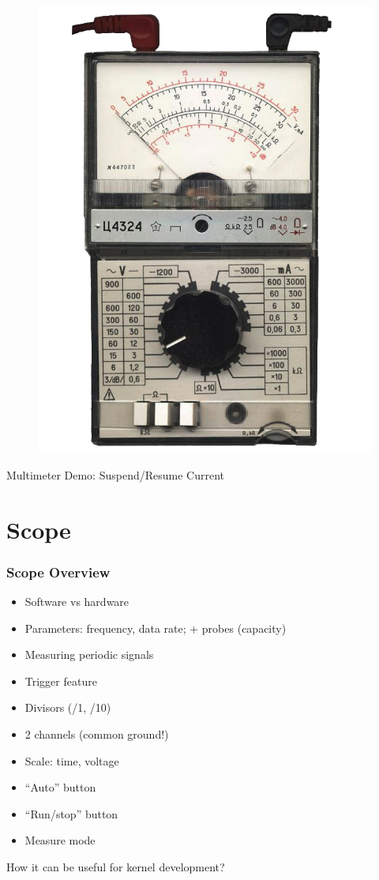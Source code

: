 \documentclass[aspectratio=169,usenames,dvipsnames]{beamer}
\begin{document}
\begin{frame}[standout]
  \begin{figure}
    \centering
    \includegraphics[scale=0.8]{images/multimeter.png}
  \end{figure}
  Multimeter Demo: Suspend/Resume Current
\end{frame}

\section{Scope}

\begin{frame}
  \frametitle{Scope Overview}
  \begin{itemize}
    \item Software vs hardware
    \item Parameters: frequency, data rate; + probes (capacity)
    \item Measuring periodic signals
    \item Trigger feature
    \item Divisors (/1, /10)
    \item 2 channels (common ground!)
    \item Scale: time, voltage
    \item ``Auto'' button
    \item ``Run/stop'' button
    \item Measure mode
  \end{itemize}
  How it can be useful for kernel development?
\end{frame}
\end{document}
